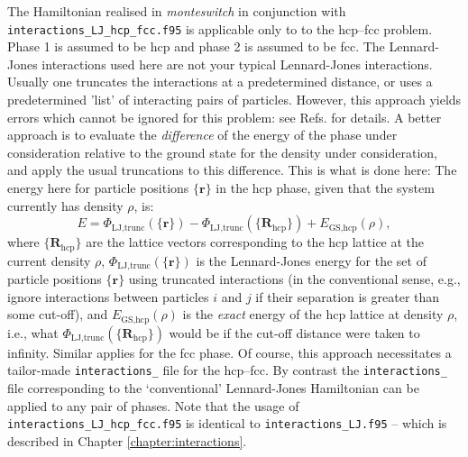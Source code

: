 \documentclass{report}
\begin{document}
The Hamiltonian realised in \emph{monteswitch} in conjunction with \texttt{interactions\_LJ\_hcp\_fcc.f95} is applicable only to
to the hcp--fcc problem. Phase 1 is assumed to be hcp and phase 2 is assumed to be fcc. The Lennard-Jones interactions
used here are not your typical Lennard-Jones interactions. Usually one truncates the interactions at
a predetermined distance, or uses a predetermined 'list' of interacting pairs of particles. However, this
approach yields errors which cannot be ignored for this problem: see Refs. \cite{thesis:Jackson,Jackson_2002} for details. A
better approach is to evaluate the \emph{difference} of the energy of the phase under consideration relative to the 
ground state for the density under consideration, and apply the usual truncations to this difference. This is what is done here:
The energy here for particle positions $\lbrace\mathbf{r}\rbrace$ in the hcp phase, given that the system currently has density $\rho$, is:
\begin{equation}
E = \Phi_{\text{LJ,trunc}}(\lbrace\mathbf{r}\rbrace)-\Phi_{\text{LJ,trunc}}(\lbrace\mathbf{R}_{\text{hcp}}\rbrace)
+ E_{\text{GS,hcp}}(\rho),
\end{equation}
where $\lbrace\mathbf{R}_{\text{hcp}}\rbrace$ are the lattice vectors corresponding to the hcp lattice at the current density $\rho$, 
$\Phi_{\text{LJ,trunc}}(\lbrace\mathbf{r}\rbrace)$ is the Lennard-Jones energy for the set of particle positions $\lbrace\mathbf{r}\rbrace$
using truncated interactions (in the conventional sense, e.g., ignore interactions between particles $i$ and $j$ if their separation is
greater than some cut-off), and $E_{\text{GS,hcp}}(\rho)$ is the \emph{exact} energy of the hcp lattice at density $\rho$, i.e., what 
$\Phi_{\text{LJ,trunc}}(\lbrace\mathbf{R}_{\text{hcp}}\rbrace)$ would be if the cut-off distance were taken to infinity. Similar applies
for the fcc phase.
Of course, this approach necessitates a tailor-made \texttt{interactions\_} file for the hcp--fcc. By contrast the \texttt{interactions\_}
file corresponding to the `conventional' Lennard-Jones Hamiltonian can be applied to any pair of phases.
Note that the usage of \texttt{interactions\_LJ\_hcp\_fcc.f95} is identical to \texttt{interactions\_LJ.f95} -- which is described in
Chapter \ref{chapter:interactions}.
\end{document}
